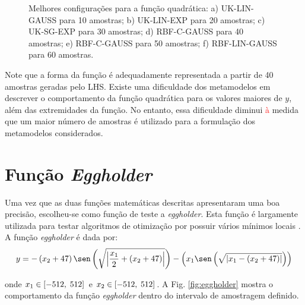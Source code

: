 \begin{figure}[H]
	\caption{Melhores configurações para a função quadrática: a) UK-LIN-GAUSS para 10 amostras; b) UK-LIN-EXP para 20 amostras; c) UK-SG-EXP para 30 amostras; d) RBF-C-GAUSS para 40 amostras; e) RBF-C-GAUSS para 50 amostras; f) RBF-LIN-GAUSS para 60 amostras.} 
	\label{fig:fl}
\end{figure}


Note que a forma da função é adequadamente representada a partir de 40 amostras geradas pelo LHS. Existe uma dificuldade dos metamodelos em descrever o comportamento da função quadrática para os valores maiores de $y$, além das extremidades da função. No entanto, essa dificuldade diminui \textcolor{red}{à} medida que um maior número de amostras é utilizado para a  formulação dos metamodelos considerados.

\section{Função \textit{Eggholder}}

Uma vez que as duas funções matemáticas descritas apresentaram uma boa precisão, escolheu-se como função de teste a {\it eggholder}. Esta função é largamente utilizada para testar algoritmos de otimização por possuir vários mínimos locais \cite{YONDO}. A função \textit{eggholder} é dada por:
\begin{equation}
y=-\left({x_2}+47\right)\sen\left(\sqrt{\left|\frac{x_1}{2}+({x_2}+47)\right|}\right)-\left({x_1}\sen\left(\sqrt{\left|{x_1}-({x_2}+47)\right|}\right)\right)
\end{equation}

\noindent onde $x_1 \in [-512, \hspace{0.1 cm}512]$ e  $x_2 \in [-512, \hspace{0.1 cm}512]$. A Fig. \ref{fig:eggholder} mostra o comportamento da função {\it eggholder} dentro do intervalo de amostragem definido.

